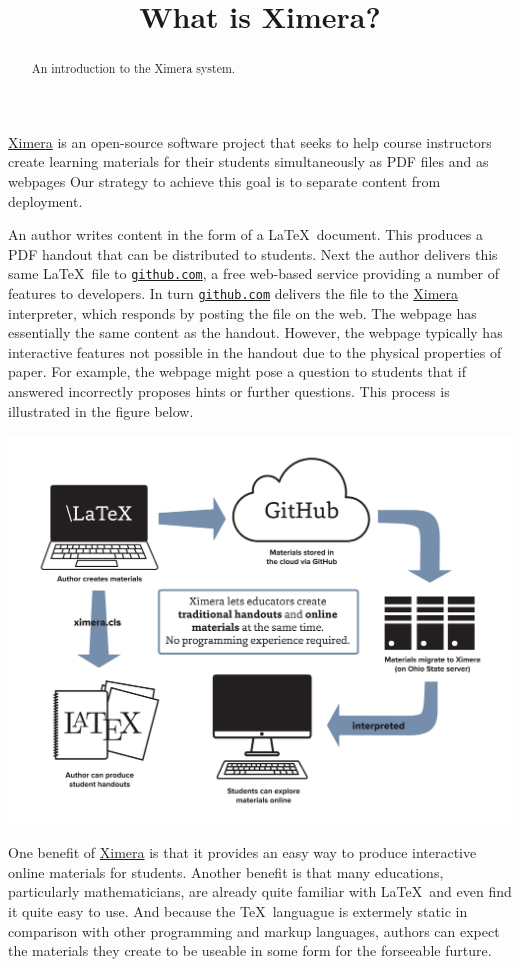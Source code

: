 \documentclass{ximera}
\title{What is Ximera?}
\begin{document}
\begin{abstract}
An introduction to the Ximera system.
\end{abstract}
\maketitle

\href{http://ximera.osu.edu}{\sf Ximera}
is an open-source software project that
seeks to help course instructors create learning materials
for their students simultaneously as PDF files and as webpages
Our strategy to achieve this goal is to separate
content from deployment.

An author writes content in the form of a \LaTeX\ document.
This produces a PDF handout that can be distributed to students.
Next the author delivers this same \LaTeX\ file to
\href{http://github.com}{\tt github.com},
a free web-based service providing a number of features to developers.
In turn \href{http://github.com}{\tt github.com} delivers
the file to the \href{http://ximera.osu.edu}{\sf Ximera}
interpreter, which responds by posting the file on the web.
The webpage has essentially the same content as the handout.
However, the webpage typically has interactive features
not possible in the handout due to the physical properties of paper.
For example, the webpage might pose a question to students
that if answered incorrectly proposes hints or further questions.
This process is illustrated in the figure below.

\begin{image}
\includegraphics[scale=.25]{XimeraGraphic.png}
\end{image}

One benefit of \href{http://ximera.osu.edu}{\sf Ximera}
is that it provides an easy way to produce interactive online
materials for students.
Another benefit is that many educations, particularly mathematicians,
are already quite familiar with \LaTeX\ and
even find it quite easy to use.
And because the \TeX\ languague is extermely static in comparison with
other programming and markup languages, authors can expect
the materials they create to be useable in some
form for the forseeable furture.
\end{document}
